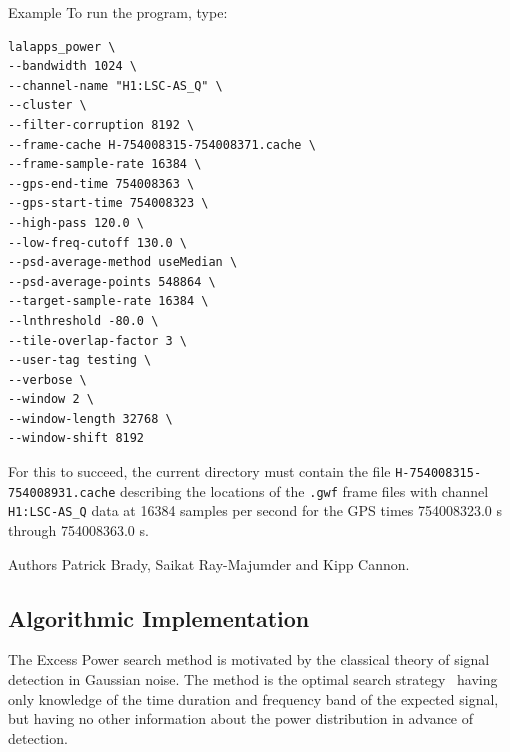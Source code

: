 \begin{entry}
\item[Example]
To run the program, type:
\begin{verbatim}
lalapps_power \
--bandwidth 1024 \
--channel-name "H1:LSC-AS_Q" \
--cluster \
--filter-corruption 8192 \
--frame-cache H-754008315-754008371.cache \
--frame-sample-rate 16384 \
--gps-end-time 754008363 \
--gps-start-time 754008323 \
--high-pass 120.0 \
--low-freq-cutoff 130.0 \
--psd-average-method useMedian \
--psd-average-points 548864 \
--target-sample-rate 16384 \
--lnthreshold -80.0 \
--tile-overlap-factor 3 \
--user-tag testing \
--verbose \
--window 2 \
--window-length 32768 \
--window-shift 8192
\end{verbatim}
For this to succeed, the current directory must contain the file
\texttt{H-754008315-754008931.cache} describing the locations of the
\texttt{.gwf} frame files with channel \verb|H1:LSC-AS_Q| data at 16384
samples per second for the GPS times 754008323.0 s through 754008363.0 s.

\item[Authors]
Patrick Brady, Saikat Ray-Majumder and Kipp Cannon.  
\end{entry}
\clearpage

\subsection{Algorithmic Implementation}

The Excess Power search method is motivated by the classical theory of
signal detection in Gaussian noise.  The method is the optimal search
strategy~\cite{Anderson:2000yy} having only knowledge of the time duration
and frequency band of the expected signal,  but having no other
information about the power distribution in advance of detection. 

